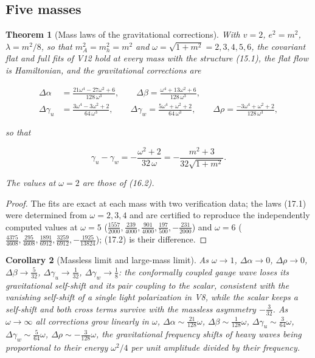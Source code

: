 \documentclass[11pt]{article}
\newtheorem{theorem}{Theorem}[section]
\newtheorem{corollary}[theorem]{Corollary}
\theoremstyle{remark}
\begin{document}
\subsection{Five masses}

\begin{theorem}[Mass laws of the gravitational corrections]
\label{thm:v20v14-laws}
With \(v=2\), \(e^2=m^2\), \(\lambda=m^2/8\), so that
\(m_A^2=m_h^2=m^2\) and \(\omega=\sqrt{1+m^2}=2,3,4,5,6\), the
covariant flat and full fits of V12 hold at every mass with the
structure (15.1), the flat flow is Hamiltonian, and the gravitational
corrections are

\[
\begin{aligned}
 \Delta\alpha&=\frac{21\omega^4-27\omega^2+6}{128\,\omega^3},\qquad
 \Delta\beta=\frac{\omega^4+13\omega^2+6}{128\,\omega^3},\\
 \Delta\gamma_u&=\frac{3\omega^4-3\omega^2+2}{64\,\omega^3},\qquad
 \Delta\gamma_w=\frac{5\omega^4+\omega^2+2}{64\,\omega^3},\qquad
 \Delta\rho=\frac{-3\omega^4+\omega^2+2}{128\,\omega^3},
\end{aligned}                                                          \tag{17.1}
\]

so that

\[
 \gamma_u-\gamma_w=-\frac{\omega^2+2}{32\,\omega}=-\frac{m^2+3}{32\sqrt{1+m^2}}.
                                                                    \tag{17.2}
\]

The values at \(\omega=2\) are those of (16.2).
\end{theorem}

\begin{proof}
The fits are exact at each mass with two verification data; the
laws (17.1) were determined from \(\omega=2,3,4\) and are certified
to reproduce the independently computed values at \(\omega=5\)
(\(\tfrac{1557}{2000},\tfrac{239}{4000},\tfrac{901}{4000},\tfrac{197}{500},-\tfrac{231}{2000}\))
and \(\omega=6\)
(\(\tfrac{4375}{4608},\tfrac{295}{4608},\tfrac{1891}{6912},\tfrac{3259}{6912},-\tfrac{1925}{13824}\));
(17.2) is their difference.
\end{proof}

\begin{corollary}[Massless limit and large-mass limit]
\label{cor:v20v14-limits}
As \(\omega\to1\), \(\Delta\alpha\to0\), \(\Delta\rho\to0\),
\(\Delta\beta\to\tfrac5{32}\), \(\Delta\gamma_u\to\tfrac1{32}\),
\(\Delta\gamma_w\to\tfrac18\): the conformally coupled gauge wave loses
its gravitational self-shift and its pair coupling to the scalar,
consistent with the vanishing self-shift of a single light
polarization in V8, while the scalar keeps a self-shift and both
cross terms survive with the massless asymmetry \(-\tfrac3{32}\).  As
\(\omega\to\infty\) all corrections grow linearly in \(\omega\),
\(\Delta\alpha\sim\tfrac{21}{128}\omega\), \(\Delta\beta\sim\tfrac1{128}\omega\),
\(\Delta\gamma_u\sim\tfrac3{64}\omega\), \(\Delta\gamma_w\sim\tfrac5{64}\omega\),
\(\Delta\rho\sim-\tfrac3{128}\omega\), the gravitational frequency shifts
of heavy waves being proportional to their energy \(\omega^2/4\) per
unit amplitude divided by their frequency.
\end{corollary}
\end{document}

